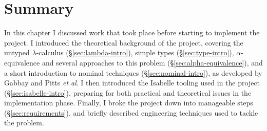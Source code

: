 \section{Summary}
In this chapter I discussed work that took place before starting to implement the project.
I introduced the theoretical background of the project, covering the untyped \(\lambda\)-calculus (\S\ref{sec:lambda-intro}), simple types (\S\ref{sec:type-intro}), \(\alpha\)-equivalence and several approaches to this problem (\S\ref{sec:alpha-equivalence}), and a short introduction to nominal techniques (\S\ref{sec:nominal-intro}), as developed by Gabbay and Pitts \emph{et al}.
I then introduced the Isabelle tooling used in the project (\S\ref{sec:isabelle-intro}), preparing for both practical and theoretical issues in the implementation phase.
Finally, I broke the project down into manageable steps (\S\ref{sec:requirements}), and briefly described engineering techniques used to tackle the problem.

